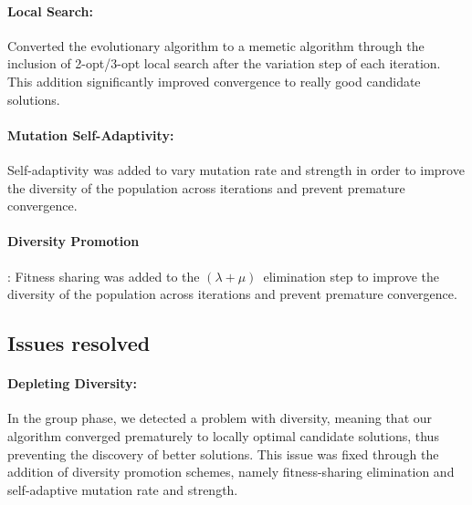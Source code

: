 \documentclass[a4paper,10pt]{article}
\newcommand{\ReplaceMe}[1]{{\color{blue}#1}}
\begin{document}
\paragraph{Local Search:} Converted the evolutionary algorithm to a memetic algorithm through the inclusion of 2-opt/3-opt local search after the variation step of each iteration. This addition significantly improved convergence to really good candidate solutions.

\paragraph{Mutation Self-Adaptivity:} Self-adaptivity was added to vary mutation rate and strength in order to improve the diversity of the population across iterations and prevent premature convergence.

\paragraph{Diversity Promotion}: Fitness sharing was added to the $(\lambda+\mu)$~elimination step to improve the diversity of the population across iterations and prevent premature convergence.


\subsection{Issues resolved}


\paragraph{Depleting Diversity:} In the group phase, we detected a problem with diversity, meaning that our algorithm converged prematurely to locally optimal candidate solutions, thus preventing the discovery of better solutions. This issue was fixed through the addition of diversity promotion schemes, namely fitness-sharing elimination and self-adaptive mutation rate and strength.
\end{document}
